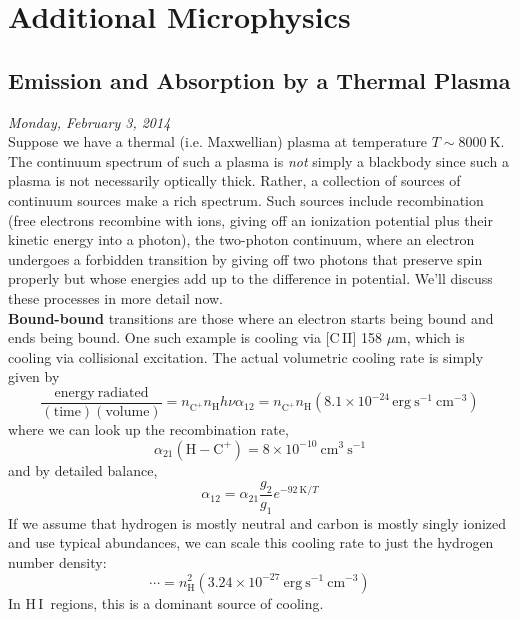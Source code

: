 \documentclass[10pt]{article}
\numberwithin{equation}{section}
\newcommand{\n}{\noindent}
\newcommand{\HI}{H\,I\ }
\begin{document}
\section{Additional Microphysics} %
\label{sec:additional_microphysics}
\subsection{Emission and Absorption by a Thermal Plasma} %
\label{sub:emission_and_absorption_by_a_thermal_plasma}
\textit{Monday, February 3, 2014}\\

\n Suppose we have a thermal (i.e. Maxwellian) plasma at temperature $T\sim
8000\ \mathrm{K}$. The continuum spectrum of such a plasma is \emph{not} simply
a blackbody since such a plasma is not necessarily optically thick. Rather, a
collection of sources of continuum sources make a rich spectrum. Such sources
include recombination (free electrons recombine with ions, giving off an
ionization potential plus their kinetic energy into a photon), the two-photon
continuum, where an electron undergoes a forbidden transition by giving off two
photons that preserve spin properly but whose energies add up to the difference
in potential. We'll discuss these processes in more detail now.\\

\n \textbf{Bound-bound} transitions are those where an electron starts being
bound and ends being bound. One such example is cooling via [C\,II] 158 $\mu$m,
which is cooling via collisional excitation. The actual volumetric cooling rate
is simply given by
\begin{equation}
  \label{eq:bbound:1} \frac{\mathrm{energy\
  radiated}}{(\mathrm{time})(\mathrm{volume})} = n_{\mathrm{C^+}}n_{\mathrm{H}}
  h\nu \alpha_{12} = n_{\mathrm{C^+}}n_{\mathrm{H}}(8.1\times
  10^{-24}\,\mathrm{erg\ s^{-1}\ cm^{-3}})
\end{equation}
where we can look up the recombination rate,
\begin{equation}
  \label{eq:bbound:2} \alpha_{21}(\mathrm{H-C^+})=8\times 10^{-10}\
  \mathrm{cm^3\ s^{-1}}
\end{equation}
and by detailed balance,
\begin{equation}
  \label{eq:bbound:3} \alpha_{12} = \alpha_{21} \frac{g_2}{g_1}e^{-92\
  \mathrm{K}/T}
\end{equation}
If we assume that hydrogen is mostly neutral and carbon is mostly singly
ionized and use typical abundances, we can scale this cooling rate to just the
hydrogen number density:
\begin{equation}
  \label{eq:bbound:3} \cdots = n_{\mathrm{H}}^2(3.24\times 10^{-27}\
  \mathrm{erg\ s^{-1}\ cm^{-3}})
\end{equation}
In \HI regions, this is a dominant source of cooling.\\
\end{document}

